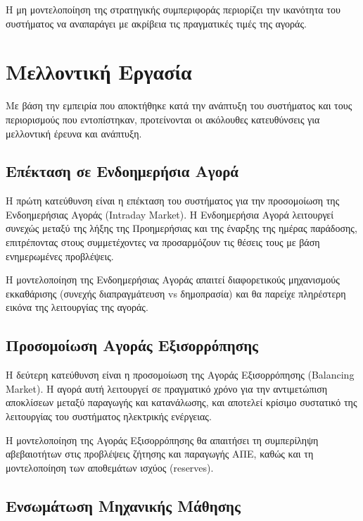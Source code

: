 Η μη μοντελοποίηση της στρατηγικής συμπεριφοράς περιορίζει την ικανότητα του συστήματος να αναπαράγει με ακρίβεια τις πραγματικές τιμές της αγοράς.


\section{Μελλοντική Εργασία}
\label{sec:future-work}

Με βάση την εμπειρία που αποκτήθηκε κατά την ανάπτυξη του συστήματος και τους περιορισμούς που εντοπίστηκαν, προτείνονται οι ακόλουθες κατευθύνσεις για μελλοντική έρευνα και ανάπτυξη.

\subsection{Επέκταση σε Ενδοημερήσια Αγορά}
\label{subsec:intraday-extension}

Η πρώτη κατεύθυνση είναι η επέκταση του συστήματος για την προσομοίωση της Ενδοημερήσιας Αγοράς (Intraday Market). Η Ενδοημερήσια Αγορά λειτουργεί συνεχώς μεταξύ της λήξης της Προημερήσιας και της έναρξης της ημέρας παράδοσης, επιτρέποντας στους συμμετέχοντες να προσαρμόζουν τις θέσεις τους με βάση ενημερωμένες προβλέψεις.

Η μοντελοποίηση της Ενδοημερήσιας Αγοράς απαιτεί διαφορετικούς μηχανισμούς εκκαθάρισης (συνεχής διαπραγμάτευση vs δημοπρασία) και θα παρείχε πληρέστερη εικόνα της λειτουργίας της αγοράς.

\subsection{Προσομοίωση Αγοράς Εξισορρόπησης}
\label{subsec:balancing-simulation}

Η δεύτερη κατεύθυνση είναι η προσομοίωση της Αγοράς Εξισορρόπησης (Balancing Market). Η αγορά αυτή λειτουργεί σε πραγματικό χρόνο για την αντιμετώπιση αποκλίσεων μεταξύ παραγωγής και κατανάλωσης, και αποτελεί κρίσιμο συστατικό της λειτουργίας του συστήματος ηλεκτρικής ενέργειας.

Η μοντελοποίηση της Αγοράς Εξισορρόπησης θα απαιτήσει τη συμπερίληψη αβεβαιοτήτων στις προβλέψεις ζήτησης και παραγωγής ΑΠΕ, καθώς και τη μοντελοποίηση των αποθεμάτων ισχύος (reserves).

\subsection{Ενσωμάτωση Μηχανικής Μάθησης}
\label{subsec:ml-integration}

